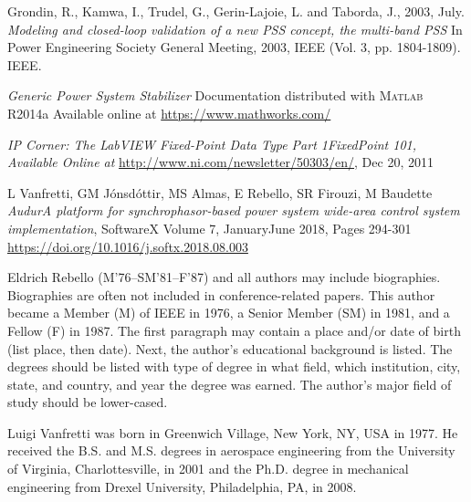 \documentclass{ieeeaccess}
\begin{document}
\begin{thebibliography}{00}
 Grondin, R., Kamwa, I., Trudel, G., Gerin-Lajoie, L. and Taborda, J., 2003, July. \emph{Modeling and closed-loop validation of a new PSS concept, the multi-band PSS} In Power Engineering Society General Meeting, 2003, IEEE (Vol. 3, pp. 1804-1809). IEEE.

 \emph{Generic Power System Stabilizer} Documentation distributed with \textsc{Matlab} R2014a Available online at \underline{https://www.mathworks.com/}

 \emph{IP Corner: The LabVIEW Fixed-Point Data Type Part 1\textendash Fixed\textendash Point 101, Available Online at} \underline{http://www.ni.com/newsletter/50303/en/}, Dec 20, 2011 

 L Vanfretti, GM J\'{o}nsd\'{o}ttir, MS Almas, E Rebello, SR Firouzi, M Baudette \emph{Audur\textendash A platform for synchrophasor-based power system wide-area control system implementation}, SoftwareX Volume 7, January\textendash June 2018, Pages 294-301 \underline{https://doi.org/10.1016/j.softx.2018.08.003}

\end{thebibliography}

\begin{IEEEbiography}{Eldrich Rebello} (M'76--SM'81--F'87) and all authors may include 
biographies. Biographies are often not included in conference-related
papers. This author became a Member (M) of IEEE in 1976, a Senior
Member (SM) in 1981, and a Fellow (F) in 1987. The first paragraph may
contain a place and/or date of birth (list place, then date). Next,
the author's educational background is listed. The degrees should be
listed with type of degree in what field, which institution, city,
state, and country, and year the degree was earned. The author's major
field of study should be lower-cased. 
\end{IEEEbiography}

\begin{IEEEbiography}{Luigi Vanfretti} was born in Greenwich Village, New York, NY, USA in 
1977. He received the B.S. and M.S. degrees in aerospace engineering from 
the University of Virginia, Charlottesville, in 2001 and the Ph.D. degree in 
mechanical engineering from Drexel University, Philadelphia, PA, in 2008.

\end{IEEEbiography}
\end{document}
